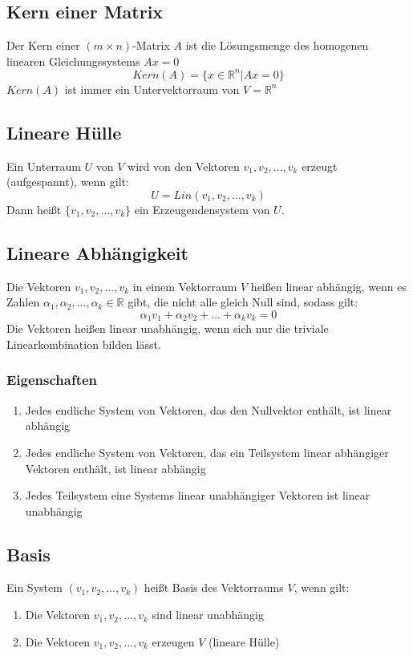\documentclass[a4paper,twocolumn,10pt]{article}
\begin{document}
\subsection{Kern einer Matrix}
Der Kern einer $(m\times n)$-Matrix $A$ ist die Lösungsmenge des homogenen linearen Gleichungssystems $Ax=0$
\begin{equation*}
Kern(A)=\{x\in\mathbb{R}^n|Ax=0\}
\end{equation*}
$Kern(A)$ ist immer ein Untervektorraum von $V=\mathbb{R}^n$

\subsection{Lineare Hülle}
Ein Unterraum $U$ von $V$ wird von den Vektoren $v_1,v_2,...,v_k$ erzeugt (aufgespannt), wenn gilt:
\begin{equation*}
U=Lin(v_1,v_2,...,v_k)
\end{equation*}
Dann heißt $\{v_1,v_2,...,v_k\}$ ein Erzeugendensystem von $U$.

\subsection{Lineare Abhängigkeit}
Die Vektoren $v_1,v_2,...,v_k$ in einem Vektorraum $V$ heißen linear abhängig, wenn es Zahlen $\alpha_1, \alpha_2,...,\alpha_k \in\mathbb{R}$ gibt, die nicht alle gleich Null sind, sodass gilt:
\begin{equation*}
\alpha_1v_1+\alpha_2v_2+...+\alpha_kv_k=0
\end{equation*}
Die Vektoren heißen linear unabhängig, wenn sich nur die triviale Linearkombination bilden lässt.

\subsubsection{Eigenschaften}
\begin{enumerate}
\item Jedes endliche System von Vektoren, das den Nullvektor enthält, ist linear abhängig
\item Jedes endliche System von Vektoren, das ein Teilsystem linear abhängiger Vektoren enthält, ist linear abhängig
\item Jedes Teilsystem eine Systems linear unabhängiger Vektoren ist linear unabhängig
\end{enumerate}

\subsection{Basis}
Ein System $(v_1,v_2,...,v_k)$ heißt Basis des Vektorraums $V$, wenn gilt:
\begin{enumerate}
\item Die Vektoren $v_1,v_2,...,v_k$ sind linear unabhängig
\item Die Vektoren $v_1,v_2,...,v_k$ erzeugen $V$ (lineare Hülle)
\end{enumerate}
\end{document}
